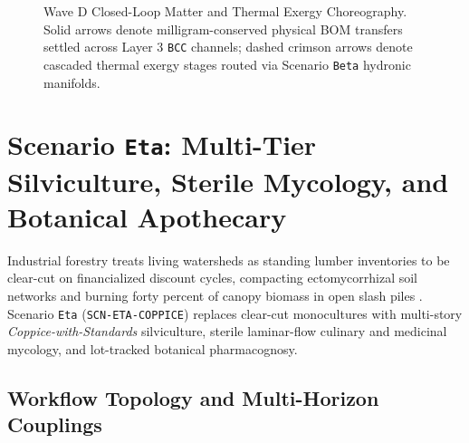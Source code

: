 \begin{figure}[htbp]
{%
}
\caption{Wave D Closed-Loop Matter and Thermal Exergy Choreography. Solid arrows denote milligram-conserved physical BOM transfers settled across Layer 3 \texttt{BCC} channels; dashed crimson arrows denote cascaded thermal exergy stages routed via Scenario \texttt{Beta} hydronic manifolds.}
\label{fig:wave-d-topology}
\end{figure}

\section{Scenario \texttt{Eta}: Multi-Tier Silviculture, Sterile Mycology, and Botanical Apothecary}
\label{sec:scn-eta}

Industrial forestry treats living watersheds as standing lumber inventories to be clear-cut on financialized discount cycles, compacting
ectomycorrhizal soil networks and burning forty percent of canopy biomass in open slash piles \parencite{scott1998,holling1973}. Scenario
\texttt{Eta} (\texttt{SCN-ETA-COPPICE}) replaces clear-cut monocultures with multi-story \emph{Coppice-with-Standards} silviculture, sterile
laminar-flow culinary and medicinal mycology, and lot-tracked botanical pharmacognosy.

\subsection{Workflow Topology and Multi-Horizon Couplings}

